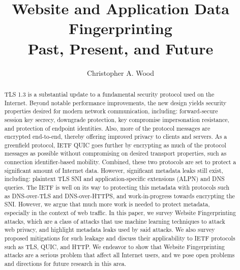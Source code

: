 \documentclass[runningheads]{llncs}
\begin{document}
\title{Website and Application Data Fingerprinting \\ Past, Present, and Future}
\author{Christopher A. Wood}

\maketitle
\begin{abstract}
TLS 1.3 is a substantial update to a fundamental security protocol used on the Internet.
Beyond notable performance improvements, the new design yields security properties desired
for modern network communication, including: forward-secure session key secrecy, downgrade
protection, key compromise impersonation resistance, and protection of endpoint identities.
Also, more of the protocol messages are encrypted end-to-end, thereby offering improved
privacy to clients and servers. As a greenfield protocol, IETF QUIC goes further by encrypting
as much of the protocol messages as possible without compromising on desired transport
properties, such as connection identifier-based mobility. Combined, these two protocols
are set to protect a significant amount of Internet data. However, significant metadata leaks still exist,
including: plaintext TLS SNI and application-specific extensions (ALPN) and DNS queries.
The IETF is well on its way to protecting this metadata with protocols such as DNS-over-TLS
and DNS-over-HTTPS, and work-in-progress towards encrypting the SNI. However, we argue that
much more work is needed to protect metadata, especially in the context of web traffic.
In this paper, we survey Website Fingerprinting attacks, which are a class of attacks that
use machine learning techniques to attack web privacy, and highlight metadata leaks used
by said attacks. We also survey proposed mitigations for such leakage and discuss their
applicability to IETF protocols such as TLS, QUIC, and HTTP. We endeavor to show that
Website Fingerprinting attacks are a serious problem that affect all Internet users,
and we pose open problems and directions for future research in this area.

\end{abstract}
\end{document}
